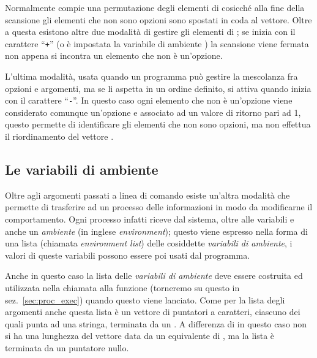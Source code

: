 Normalmente  compie una permutazione degli elementi di
 cosicché alla fine della scansione gli elementi che non sono
opzioni sono spostati in coda al vettore. Oltre a questa esistono altre due
modalità di gestire gli elementi di ; se  inizia
con il carattere ``\texttt{+}'' (o è impostata la variabile di ambiente
) la scansione viene fermata non appena si incontra un
elemento che non è un'opzione.

L'ultima modalità, usata quando un programma può gestire la mescolanza fra
opzioni e argomenti, ma se li aspetta in un ordine definito, si attiva
quando  inizia con il carattere ``\texttt{-}''. In questo caso
ogni elemento che non è un'opzione viene considerato comunque un'opzione e
associato ad un valore di ritorno pari ad 1, questo permette di identificare
gli elementi che non sono opzioni, ma non effettua il riordinamento del
vettore .


\subsection{Le variabili di ambiente}
\label{sec:proc_environ}

Oltre agli argomenti passati a linea di comando esiste un'altra modalità che
permette di trasferire ad un processo delle informazioni in modo da
modificarne il comportamento.  Ogni processo infatti riceve dal sistema, oltre
alle variabili  e  anche un \textsl{ambiente} (in
inglese \textit{environment}); questo viene espresso nella forma di una lista
(chiamata \textit{environment list}) delle cosiddette \textsl{variabili di
  ambiente}, i valori di queste variabili possono essere poi usati dal
programma.

Anche in questo caso la lista delle \textsl{variabili di ambiente} deve essere
costruita ed utilizzata nella chiamata alla funzione  (torneremo su
questo in sez.~\ref{sec:proc_exec}) quando questo viene lanciato. Come per la
lista degli argomenti anche questa lista è un vettore di puntatori a
caratteri, ciascuno dei quali punta ad una stringa, terminata da un
. A differenza di  in questo caso non si ha una
lunghezza del vettore data da un equivalente di , ma la lista è
terminata da un puntatore nullo.

